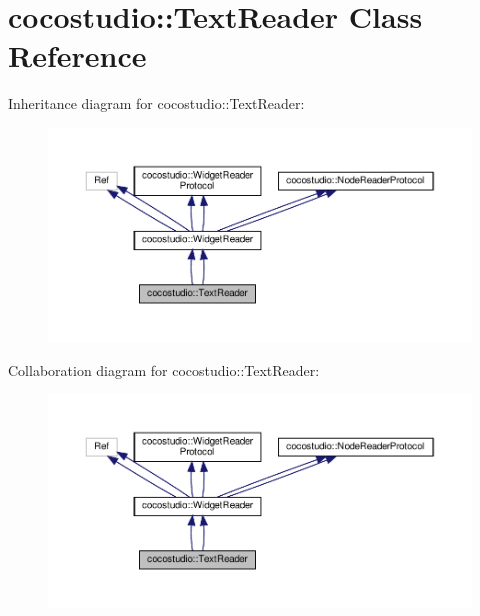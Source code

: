 \hypertarget{classcocostudio_1_1TextReader}{}\section{cocostudio\+:\+:Text\+Reader Class Reference}
\label{classcocostudio_1_1TextReader}


Inheritance diagram for cocostudio\+:\+:Text\+Reader\+:
\nopagebreak
\begin{figure}[H]
\begin{center}
\leavevmode
\includegraphics[width=350pt]{classcocostudio_1_1TextReader__inherit__graph}
\end{center}
\end{figure}


Collaboration diagram for cocostudio\+:\+:Text\+Reader\+:
\nopagebreak
\begin{figure}[H]
\begin{center}
\leavevmode
\includegraphics[width=350pt]{classcocostudio_1_1TextReader__coll__graph}
\end{center}
\end{figure}
